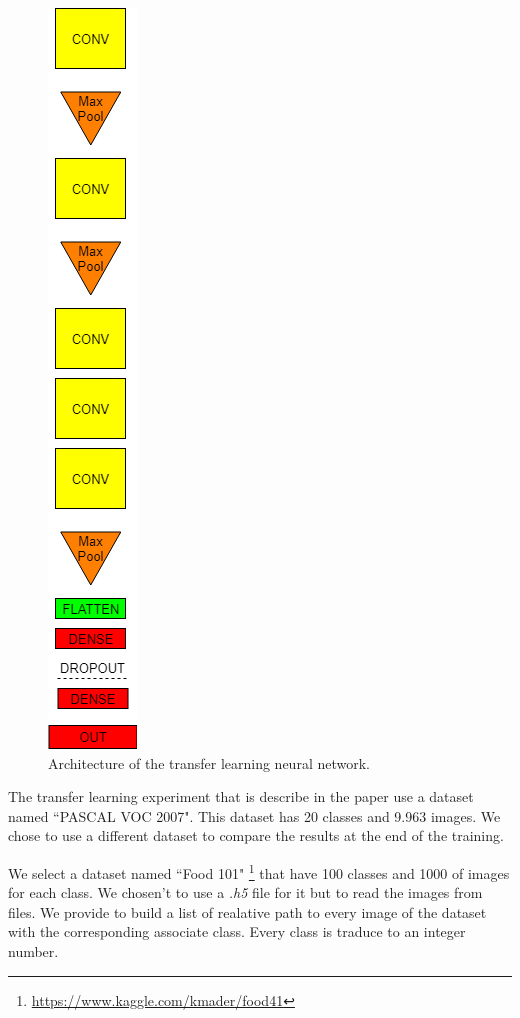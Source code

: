 \begin{figure}[!ht]
	\centering
	\includegraphics[scale=0.26]{images/FT_net.png}
	\caption{Architecture of the transfer learning neural network.}
	\label{fig:FT_net}
\end{figure}

The transfer learning experiment that is describe in the paper use a dataset named \textquotedblleft PASCAL VOC 2007". This dataset has 20 classes and 9.963 images. We chose to use a different dataset to compare the results at the end of the training.

We select a dataset named \textquotedblleft Food 101" \footnote{\url{https://www.kaggle.com/kmader/food41}} that have 100 classes and 1000 of images for each class. We chosen't to use a \textit{.h5} file for it but to read the images from files. We provide to build a list of realative path to every image of the dataset with the corresponding associate class. Every class is traduce to an integer number. 

